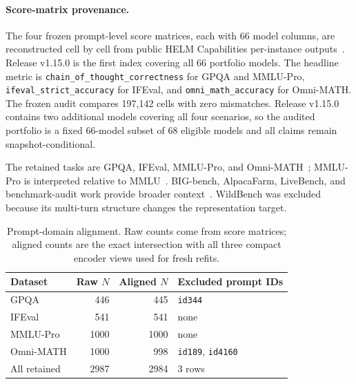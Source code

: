 \documentclass{article}
\begin{document}
\paragraph{Score-matrix provenance.}
The four frozen prompt-level score matrices, each with 66 model columns, are reconstructed cell by cell from public HELM Capabilities per-instance outputs~\citep{xu2025helmcapabilities}. Release v1.15.0 is the first index covering all 66 portfolio models. The headline metric is \texttt{chain\_of\_thought\_correctness} for GPQA and MMLU-Pro, \texttt{ifeval\_strict\_accuracy} for IFEval, and \texttt{omni\_math\_accuracy} for Omni-MATH. The frozen audit compares 197,142 cells with zero mismatches. Release v1.15.0 contains two additional models covering all four scenarios, so the audited portfolio is a fixed 66-model subset of 68 eligible models and all claims remain snapshot-conditional.

The retained tasks are GPQA, IFEval, MMLU-Pro, and Omni-MATH~\citep{rein2024gpqa, zhou2023ifeval, wang2024mmlupro, gao2025omnimath}; MMLU-Pro is interpreted relative to MMLU~\citep{hendrycks2021mmlu}. BIG-bench, AlpacaFarm, LiveBench, and benchmark-audit work provide broader context~\citep{srivastava2023bigbench, dubois2023alpacafarm, white2025livebench, raji2021benchmark, schaeffer2023mirage}. WildBench was excluded because its multi-turn structure changes the representation target.

\begin{table}[h]
  \caption{Prompt-domain alignment. Raw counts come from score matrices; aligned counts are the exact intersection with all three compact encoder views used for fresh refits.}
  \label{tab:app-prompt-length}
  \centering
  \small
  \begin{tabular}{lrrl}
    \toprule
    Dataset & Raw $N$ & Aligned $N$ & Excluded prompt IDs \\
    \midrule
    GPQA & 446 & 445 & \texttt{id344} \\
    IFEval & 541 & 541 & none \\
    MMLU-Pro & 1000 & 1000 & none \\
    Omni-MATH & 1000 & 998 & \texttt{id189}, \texttt{id4160} \\
    All retained & 2987 & 2984 & 3 rows \\
    \bottomrule
  \end{tabular}
\end{table}
\end{document}
